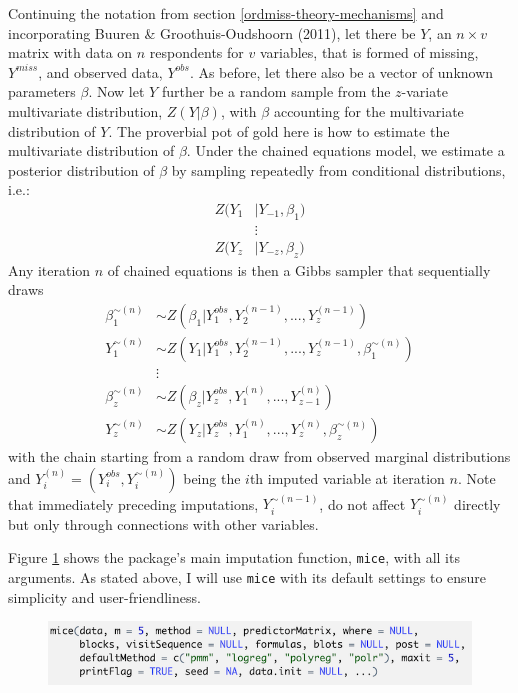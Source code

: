 \documentclass[12pt,econ]{sources/authesis}
\makeatletter
\def\maxwidth{\ifdim\Gin@nat@width>\linewidth\linewidth
\else\Gin@nat@width\fi}
\let\Oldincludegraphics\includegraphics
\renewcommand{\includegraphics}[1]{\Oldincludegraphics[width=\maxwidth]{#1}}
\def\caption{\refstepcounter\@captype \@dblarg{\@caption\@captype}}
\makeatother
\begin{document}
Continuing the notation from section \ref{ordmiss-theory-mechanisms} and incorporating Buuren \& Groothuis-Oudshoorn (2011), let there be \(Y\), an \(n \times v\) matrix with data on \(n\) respondents for \(v\) variables, that is formed of missing, \(Y^{miss}\), and observed data, \(Y^{obs}\). As before, let there also be a vector of unknown parameters \(\beta\). Now let \(Y\) further be a random sample from the \(z\)-variate multivariate distribution, \(Z(Y | \beta)\), with \(\beta\) accounting for the multivariate distribution of \(Y\). The proverbial pot of gold here is how to estimate the multivariate distribution of \(\beta\). Under the chained equations model, we estimate a posterior distribution of \(\beta\) by sampling repeatedly from conditional distributions, i.e.:
\begin{align}
Z(Y_1 &| Y_{-1}, \beta_1) \nonumber\\
&\vdots \nonumber\\
Z(Y_z &| Y_{-z}, \beta_z)
\end{align}
Any iteration \(n\) of chained equations is then a Gibbs sampler that sequentially draws
\begin{align}
\beta_1^{\sim(n)} &\sim Z(\beta_1 | Y_1^{obs}, Y_2^{(n-1)}, ..., Y_z^{(n-1)}) \nonumber\\
Y_1^{\sim(n)} &\sim Z(Y_1 | Y_1^{obs}, Y_2^{(n-1)}, ..., Y_z^{(n-1)}, \beta_1^{\sim(n)}) \nonumber\\
&\vdots \nonumber\\
\beta_z^{\sim(n)} &\sim Z(\beta_z | Y_z^{obs}, Y_1^{(n)}, ..., Y_{z-1}^{(n)}) \nonumber\\
Y_z^{\sim(n)} &\sim Z(Y_z | Y_z^{obs}, Y_1^{(n)}, ..., Y_z^{(n)}, \beta_z^{\sim(n)})
\end{align}
with the chain starting from a random draw from observed marginal distributions and \(Y_i^{(n)} = (Y_i^{obs}, Y_i^{\sim(n)})\) being the \(i\)th imputed variable at iteration \(n\). Note that immediately preceding imputations, \(Y_i^{\sim(n-1)}\), do not affect \(Y_i^{\sim(n)}\) directly but only through connections with other variables.

Figure \ref{mice-func} shows the package's main imputation function, \texttt{mice}, with all its arguments. As stated above, I will use \texttt{mice} with its default settings to ensure simplicity and user-friendliness.

\vspace{0.5cm}
\begin{figure}[!htbp] 
  \centering
  \includegraphics{figures/mice.png}
  \caption{The \texttt{mice} Function}
  \label{mice-func}
\end{figure}
\vspace{-0.5cm}
\end{document}
